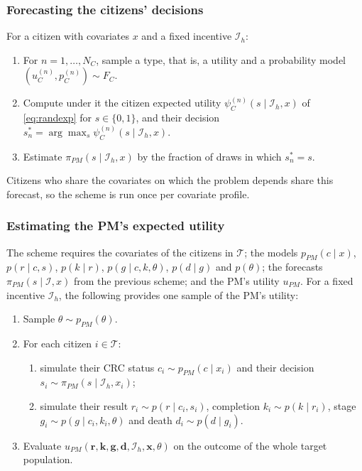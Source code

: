 \documentclass[12pt]{article}
\begin{document}
\subsubsection{Forecasting the citizens' decisions}\label{app:simulation_public_forecast}
For a citizen with covariates $x$ and a fixed incentive $\mathcal{I}_h$:
\begin{enumerate}
  \item For $n = 1, \dots, N_C$, sample a type, that is, a utility and a probability model $(u_C^{(n)}, p_C^{(n)}) \sim F_C$.
  \item Compute under it the citizen expected utility $\psi_C^{(n)}(s \mid \mathcal{I}_h, x)$ of \eqref{eq:randexp} for $s \in \{0, 1\}$, and their decision $s_n^* = \arg\max_s \psi_C^{(n)}(s \mid \mathcal{I}_h, x)$.
  \item Estimate $\pi_{PM}(s \mid \mathcal{I}_h, x)$ by the fraction of draws in which $s_n^* = s$.
\end{enumerate}
Citizens who share the covariates on which the problem depends share this forecast, so the scheme is run once per covariate profile.

\subsubsection{Estimating the PM's expected utility}\label{app:simulation_public_utility}
The scheme requires the covariates of the citizens in $\mathcal{T}$; the models $p_{PM}(c \mid x)$, $p(r \mid c, s)$, $p(k \mid r)$, $p(g \mid c, k, \theta)$, $p(d \mid g)$ and $p(\theta)$; the forecasts $\pi_{PM}(s \mid \mathcal{I}, x)$ from the previous scheme; and the PM's utility $u_{PM}$. For a fixed incentive $\mathcal{I}_h$, the following provides one sample of the PM's utility:
\begin{enumerate}
  \item Sample $\theta \sim p_{PM}(\theta)$.
  \item For each citizen $i \in \mathcal{T}$:
  \begin{enumerate}
    \item simulate their CRC status $c_i \sim p_{PM}(c \mid x_i)$ and their decision $s_i \sim \pi_{PM}(s \mid \mathcal{I}_h, x_i)$;
    \item simulate their result $r_i \sim p(r \mid c_i, s_i)$, completion $k_i \sim p(k \mid r_i)$, stage $g_i \sim p(g \mid c_i, k_i, \theta)$ and death $d_i \sim p(d \mid g_i)$.
  \end{enumerate}
  \item Evaluate $u_{PM}(\mathbf{r}, \mathbf{k}, \mathbf{g}, \mathbf{d}, \mathcal{I}_h, \mathbf{x}, \theta)$ on the outcome of the whole target population.
\end{enumerate}
\end{document}
